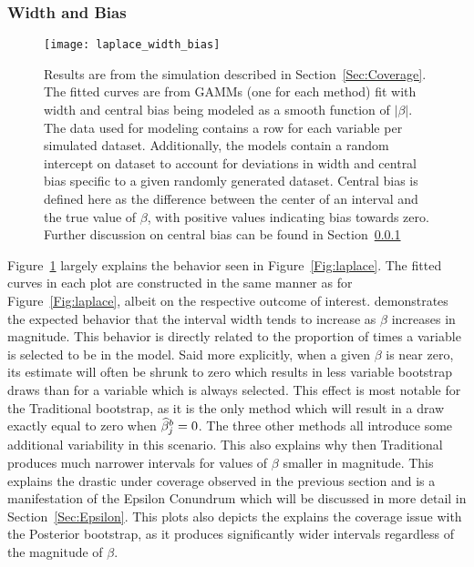 \subsubsection{Width and Bias}\label{Sec:Width and Bias}

\begin{figure}
  \texttt{[image: laplace\_width\_bias]}
  \caption{\label{Fig:laplace_width_bias} Results are from the simulation described in Section~\ref{Sec:Coverage}. The fitted curves are from GAMMs (one for each method) fit with width and central bias being modeled as a smooth function of $|\beta|$. The data used for modeling contains a row for each variable per simulated dataset. Additionally, the models contain a random intercept on dataset to account for deviations in width and central bias specific to a given randomly generated dataset. Central bias is defined here as the difference between the center of an interval and the true value of $\beta$, with positive values indicating bias towards zero. Further discussion on central bias can be found in Section~\ref{Sec:Width and Bias}}
\end{figure}

Figure~\ref{Fig:laplace_width_bias} largely explains the behavior seen in Figure~\ref{Fig:laplace}. The fitted curves in each plot are constructed in the same manner as for Figure~\ref{Fig:laplace}, albeit on the respective outcome of interest.  demonstrates the  expected behavior that the interval width tends to increase as $\beta$ increases in magnitude. This behavior is directly related to the proportion of times a variable is selected to be in the model. Said more explicitly, when a given $\beta$ is near zero, its estimate will often be shrunk to zero which results in less variable bootstrap draws than for a variable which is always selected. This effect is most notable for the Traditional bootstrap, as it is the only method which will result in a draw exactly equal to zero when $\widehat{\beta}^b_j = 0$. The three other methods all introduce some additional variability in this scenario. This also explains why then Traditional produces much narrower intervals for values of $\beta$ smaller in magnitude. This explains the drastic under coverage observed in the previous section and is a manifestation of the Epsilon Conundrum which will be discussed in more detail in Section~\ref{Sec:Epsilon}. This plots also depicts the explains the coverage issue with the Posterior bootstrap, as it produces significantly wider intervals regardless of the magnitude of $\beta$.

